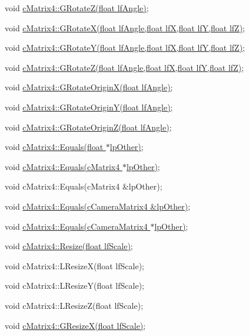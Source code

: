  void \hyperlink{classc_matrix4_a1d082ca0f1c634d262309eb75a9e2df5}{cMatrix4::GRotateZ(float lfAngle)}; \par
 \par
 void \hyperlink{classc_matrix4_a517140950c736c74a44d34704b44c83d}{cMatrix4::GRotateX(float lfAngle,float lfX,float lfY,float lfZ)}; \par
 void \hyperlink{classc_matrix4_a5b1505c43d9382bc625fc1eb53d44360}{cMatrix4::GRotateY(float lfAngle,float lfX,float lfY,float lfZ)}; \par
 void \hyperlink{classc_matrix4_a5b357f5686b74e0feeff7eaae070f566}{cMatrix4::GRotateZ(float lfAngle,float lfX,float lfY,float lfZ)}; \par
 \par
 void \hyperlink{classc_matrix4_a3ddcb503ea46911e194a9b881a6f0bee}{cMatrix4::GRotateOriginX(float lfAngle)}; \par
 void \hyperlink{classc_matrix4_abe68a204b91201b33adc32f5b354631e}{cMatrix4::GRotateOriginY(float lfAngle)}; \par
 void \hyperlink{classc_matrix4_af5ecfcfab719acf23ddb1148ad24825a}{cMatrix4::GRotateOriginZ(float lfAngle)}; \par
 \par
 void \hyperlink{classc_matrix4_adb76264fa82ef10ebb24b64d6293bc9d}{cMatrix4::Equals(float $\ast$lpOther)}; \par
 void \hyperlink{classc_matrix4_a943edd1e04048bd2bcb93987a6c47819}{cMatrix4::Equals(cMatrix4 $\ast$lpOther)}; \par
 void cMatrix4::Equals(cMatrix4 \&lpOther); \par
 void \hyperlink{classc_matrix4_a0af5e0b1dbbe6d7f4c512a5f07f1e273}{cMatrix4::Equals(cCameraMatrix4 \&lpOther)}; \par
 void \hyperlink{classc_matrix4_a12b028ad76a776c5a01d695ea620962b}{cMatrix4::Equals(cCameraMatrix4 $\ast$lpOther)}; \par
 \par
 void \hyperlink{classc_matrix4_a4785b8464f65d9784db634f3a6f34e52}{cMatrix4::Resize(float lfScale)}; \par
 \par
 void cMatrix4::LResizeX(float lfScale); \par
 void cMatrix4::LResizeY(float lfScale); \par
 void cMatrix4::LResizeZ(float lfScale); \par
 \par
 void \hyperlink{classc_matrix4_ac2be3e4653b0c8324c6a505e54544043}{cMatrix4::GResizeX(float lfScale)}; \par
